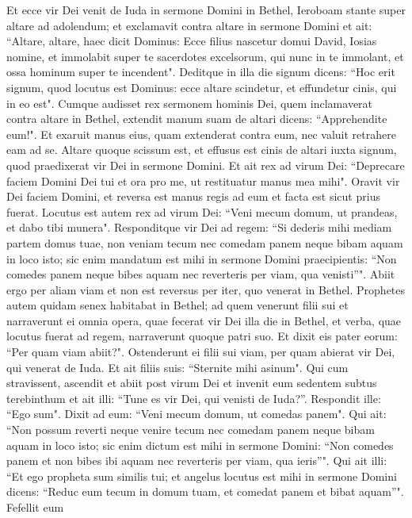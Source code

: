 \begin{biblechapter}  
\verse Et ecce vir Dei venit de Iuda in sermone Domini in Bethel, Ieroboam stante super altare ad adolendum; 
\verse et exclamavit contra altare in sermone Domini et ait: “Altare, altare, haec dicit Dominus: Ecce filius nascetur domui David, Iosias nomine, et immolabit super te sacerdotes excelsorum, qui nunc in te immolant, et ossa hominum super te incendent". 
\verse Deditque in illa die signum dicens: “Hoc erit signum, quod locutus est Dominus: ecce altare scindetur, et effundetur cinis, qui in eo est". 
\verse Cumque audisset rex sermonem hominis Dei, quem inclamaverat contra altare in Bethel, extendit manum suam de altari dicens: “Apprehendite eum!". Et exaruit manus eius, quam extenderat contra eum, nec valuit retrahere eam ad se. 
\verse Altare quoque scissum est, et effusus est cinis de altari iuxta signum, quod praedixerat vir Dei in sermone Domini. 
\verse Et ait rex ad virum Dei: “Deprecare faciem Domini Dei tui et ora pro me, ut restituatur manus mea mihi". Oravit vir Dei faciem Domini, et reversa est manus regis ad eum et facta est sicut prius fuerat. 
\verse Locutus est autem rex ad virum Dei: “Veni mecum domum, ut prandeas, et dabo tibi munera". 
\verse Responditque vir Dei ad regem: “Si dederis mihi mediam partem domus tuae, non veniam tecum nec comedam panem neque bibam aquam in loco isto; 
\verse sic enim mandatum est mihi in sermone Domini praecipientis: “Non comedes panem neque bibes aquam nec reverteris per viam, qua venisti”". 
\verse Abiit ergo per aliam viam et non est reversus per iter, quo venerat in Bethel. 
\verse Prophetes autem quidam senex habitabat in Bethel; ad quem venerunt filii sui et narraverunt ei omnia opera, quae fecerat vir Dei illa die in Bethel, et verba, quae locutus fuerat ad regem, narraverunt quoque patri suo. 
\verse Et dixit eis pater eorum: “Per quam viam abiit?". Ostenderunt ei filii sui viam, per quam abierat vir Dei, qui venerat de Iuda. 
\verse Et ait filiis suis: “Sternite mihi asinum". Qui cum stravissent, ascendit 
\verse et abiit post virum Dei et invenit eum sedentem subtus terebinthum et ait illi: “Tune es vir Dei, qui venisti de Iuda?”. Respondit ille: “Ego sum". 
\verse Dixit ad eum: “Veni mecum domum, ut comedas panem". 
\verse Qui ait: “Non possum reverti neque venire tecum nec comedam panem neque bibam aquam in loco isto; 
\verse sic enim dictum est mihi in sermone Domini: “Non comedes panem et non bibes ibi aquam nec reverteris per viam, qua ieris”". 
\verse Qui ait illi: “Et ego propheta sum similis tui; et angelus locutus est mihi in sermone Domini dicens: “Reduc eum tecum in domum tuam, et comedat panem et bibat aquam”". Fefellit eum 

\end{biblechapter}
